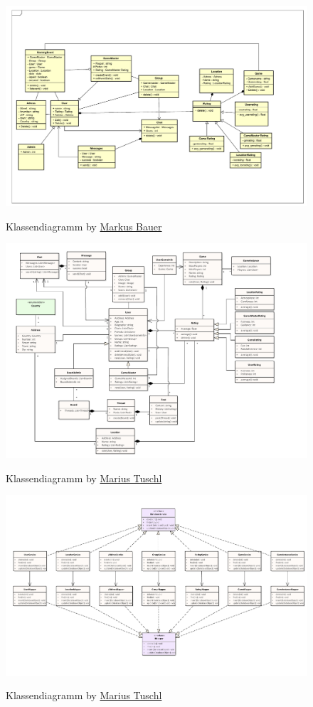 	\begin{figure}[h!]
		\centering
		\includegraphics[width =\linewidth]{docs/5_Klassendiagramme/Markus/Klassendiagramm.pdf}
		\label{fig:ClassDia_Markus}
		\caption*{Klassendiagramm by \hyperref[person:MarkusBauer]{Markus Bauer}}
	\end{figure}

	\begin{figure}[h!]
		\centering
		\includegraphics[width = \linewidth]{docs/5_Klassendiagramme/Marius/DomainLayer.pdf}
		\label{fig:ClassDia_Marius}
		\caption*{Klassendiagramm by \hyperref[person:MariusTuschl]{Marius Tuschl}}
	\end{figure}

	\begin{figure}[h!]
		\centering
		\includegraphics[width = \linewidth]{docs/5_Klassendiagramme/Marius/ServiceLayer.pdf}
		\label{fig:ClassDia_Marius}
		\caption*{Klassendiagramm by \hyperref[person:MariusTuschl]{Marius Tuschl}}
	\end{figure}

